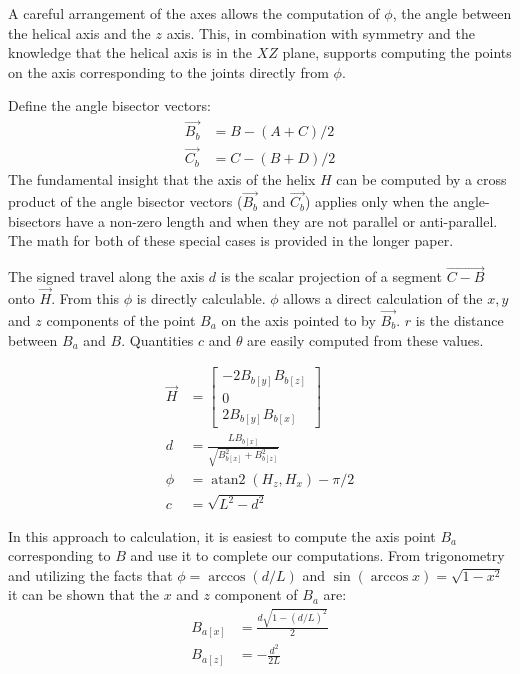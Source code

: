 \documentclass{svproc}
\DeclareMathOperator{\atantwo}{atan2}
\begin{document}
A careful arrangement of the axes
allows the computation of $\phi$, the angle between the helical axis
and the $z$ axis. This, in combination with symmetry and the knowledge
that the helical axis is in the $XZ$ plane, supports computing the
points on the axis corresponding to the joints directly from $\phi$.

Define the angle bisector vectors:
\begin{align}
  \overrightarrow{B_b} &= B - (A + C)/2 \\
  \overrightarrow{C_b} &= C - (B + D)/2
  \end{align}
The fundamental insight that the axis of the helix $H$ can be
computed by a cross product of the angle bisector
vectors ($\overrightarrow{B_b}$ and $\overrightarrow{C_b}$) applies only
when the angle-bisectors have a non-zero length and when
they are not parallel or anti-parallel.
The math for both of these special cases is provided in the longer paper\cite{readfullsegmentedhelix}.

The signed travel along the axis $d$ is
the scalar projection of a segment $\overrightarrow{C - B}$ onto $\overrightarrow{H}$.
From this $\phi$ is directly calculable. $\phi$ allows
a direct calculation of the $x,y$ and $z$ components of the
point $B_a$ on the axis pointed to by $\overrightarrow{B_b}$.
$r$ is the distance between $B_a$ and $B$. Quantities $c$ and $\theta$
are easily computed from these values.

\begin{align}
  \overrightarrow{H} &=  \begin{bmatrix} -2 B_{b[y]} B_{b[z]} \\ 0 \\ 2 B_{b[y]} B_{b[x]}  \end{bmatrix} \\
  d &= \frac{L B_{b[x]}}{\sqrt{B_{b[x]}^2 + B_{b[z]}^2}}  \\
  \phi &= \atantwo{(H_z,H_x)} - \pi/2  \\
  c &= \sqrt{L^2 - d^2}
\end{align}

In this approach to calculation, it is easiest
to compute the axis point $B_a$ corresponding to $B$ and
use it to complete our computations.
From trigonometry and utilizing the facts that $\phi = \arccos{(d/L)}$  and $\sin{(\arccos{x})} = \sqrt{1 - x^2}$ it
can be shown that
the $x$ and $z$ component of $B_a$ are:
\begin{align}
  B_{a[x]} &= \frac{d\sqrt{1 - (d/L)^2}}{2} \\
  B_{a[z]} &= -\frac{d^2}{2L}
\end{align}
\end{document}
